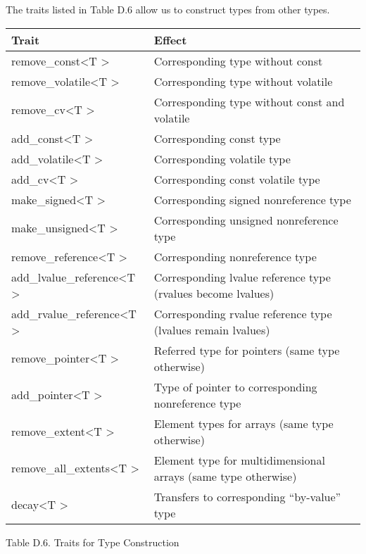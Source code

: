 
The traits listed in Table D.6 allow us to construct types from other types.

\begin{table}[H]
	\begin{tabular}{|l|l|}
		\hline
		\textbf{Trait}                                    & \textbf{Effect}                                                \\ \hline
		remove\_const\textless{}T \textgreater{}          & Corresponding type without const                               \\ \hline
		remove\_volatile\textless{}T \textgreater{}       & Corresponding type without volatile                            \\ \hline
		remove\_cv\textless{}T \textgreater{}             & Corresponding type without const and volatile                  \\ \hline
		add\_const\textless{}T \textgreater{}             & Corresponding const type                                       \\ \hline
		add\_volatile\textless{}T \textgreater{}          & Corresponding volatile type                                    \\ \hline
		add\_cv\textless{}T \textgreater{}                & Corresponding const volatile type                              \\ \hline
		make\_signed\textless{}T \textgreater{}           & Corresponding signed nonreference type                         \\ \hline
		make\_unsigned\textless{}T \textgreater{}         & Corresponding unsigned nonreference type                       \\ \hline
		remove\_reference\textless{}T \textgreater{}      & Corresponding nonreference type                                \\ \hline
		add\_lvalue\_reference\textless{}T \textgreater{} & Corresponding lvalue reference type (rvalues become lvalues)   \\ \hline
		add\_rvalue\_reference\textless{}T \textgreater{} & Corresponding rvalue reference type (lvalues remain lvalues)   \\ \hline
		remove\_pointer\textless{}T \textgreater{}        & Referred type for pointers (same type otherwise)               \\ \hline
		add\_pointer\textless{}T \textgreater{}           & Type of pointer to corresponding nonreference type             \\ \hline
		remove\_extent\textless{}T \textgreater{}         & Element types for arrays (same type otherwise)                 \\ \hline
		remove\_all\_extents\textless{}T \textgreater{}   & Element type for multidimensional arrays (same type otherwise) \\ \hline
		decay\textless{}T \textgreater{}                  & Transfers to corresponding “by-value” type                     \\ \hline
	\end{tabular}
\end{table}

\begin{center}
Table D.6. Traits for Type Construction
\end{center}






